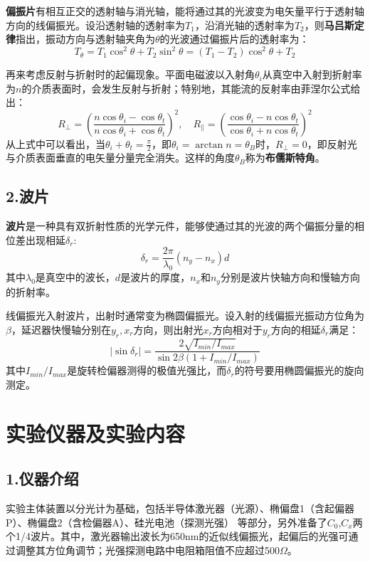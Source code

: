 \documentclass{ctexart}
\begin{document}
\textbf{偏振片}有相互正交的透射轴与消光轴，能将通过其的光波变为电矢量平行于透射轴方向的线偏振光。设沿透射轴的透射率为$T_1$，沿消光轴的透射率为$T_2$，则\textbf{马吕斯定律}指出，振动方向与透射轴夹角为$\theta$的光波通过偏振片后的透射率为：
\begin{equation}
  T_{\theta}=T_1\cos^2{\theta}+T_2\sin^2{\theta}=(T_1-T_2)\cos^2{\theta}+T_2
\end{equation}

再来考虑反射与折射时的起偏现象。平面电磁波以入射角$\theta_i$从真空中入射到折射率为$n$的介质表面时，会发生反射与折射；特别地，其能流的反射率由菲涅尔公式给出：
\begin{equation}
  R_{\perp}=\left(\frac{n\cos{\theta_i}-\cos{\theta_t}}{n\cos{\theta_i}+\cos{\theta_t}}\right)^2,\quad R_{\parallel}=\left(\frac{\cos{\theta_i}-n\cos{\theta_t}}{\cos{\theta_i}+n\cos{\theta_t}}\right)^2
\end{equation}
从上式中可以看出，当$\theta_i+\theta_t=\frac{\pi}{2}$，即$\theta_i=\arctan{n}=\theta_B$时，$R_{\perp}=0$，即反射光与介质表面垂直的电矢量分量完全消失。这样的角度$\theta_B$称为\textbf{布儒斯特角}。

\subsection*{2.\quad 波片}
\textbf{波片}是一种具有双折射性质的光学元件，能够使通过其的光波的两个偏振分量的相位差出现相延$\delta_r$:
\begin{equation}
  \delta_r=\frac{2\pi}{\lambda_0}(n_y-n_x)d
\end{equation}
其中$\lambda_0$是真空中的波长，$d$是波片的厚度，$n_x$和$n_y$分别是波片快轴方向和慢轴方向的折射率。

线偏振光入射波片，出射时通常变为椭圆偏振光。设入射的线偏振光振动方位角为$\beta$，延迟器快慢轴分别在$y_r,x_r$方向，则出射光$x_r$方向相对于$y_r$方向的相延$\delta_r$满足：
\begin{equation}
  |\sin{\delta_r}|=\frac{2\sqrt{I_{min}/I_{max}}}{\sin{2\beta}(1+I_{min}/I_{max})}
\end{equation}
其中$I_{min}/I_{max}$是旋转检偏器测得的极值光强比，而$\delta_r$的符号要用椭圆偏振光的旋向测定。
\section{实验仪器及实验内容}
\subsection*{1.\quad 仪器介绍}
实验主体装置以分光计为基础，包括半导体激光器（光源）、椭偏盘1（含起偏器P）、椭偏盘2（含检偏器A）、硅光电池（探测光强） 等部分，另外准备了$C_0$,$C_x$两个1/4波片。其中，激光器输出波长为650nm的近似线偏振光，起偏后的光强可通过调整其方位角调节；光强探测电路中电阻箱阻值不应超过500$\Omega$。
\end{document}
